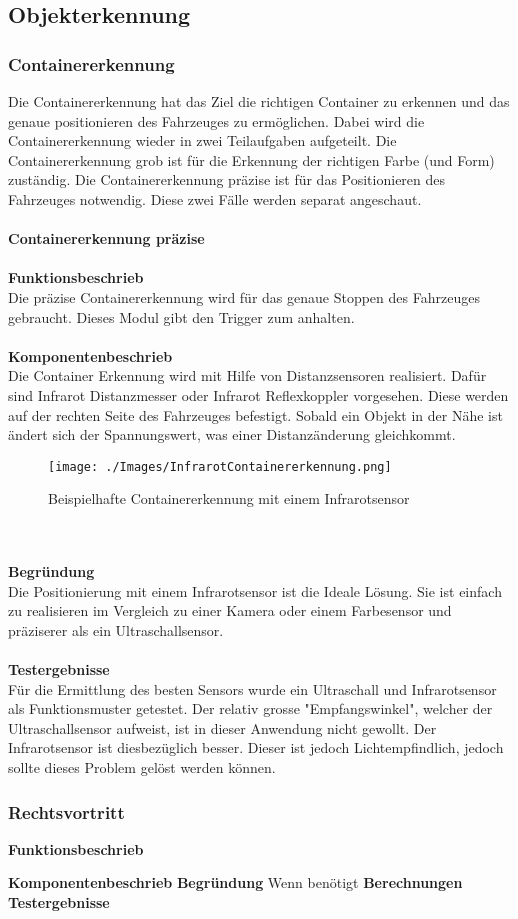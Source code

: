 \subsection{Objekterkennung}

\subsubsection{Containererkennung}
Die Containererkennung hat das Ziel die richtigen Container zu erkennen und das genaue positionieren des Fahrzeuges zu ermöglichen. Dabei wird die Containererkennung wieder in zwei Teilaufgaben aufgeteilt. Die Containererkennung grob ist für die Erkennung der richtigen Farbe (und Form) zuständig. Die Containererkennung präzise ist für das Positionieren des Fahrzeuges notwendig. Diese zwei Fälle werden separat angeschaut.\\
\\
\textbf{Containererkennung präzise}\\
\\
\textbf{Funktionsbeschrieb}\\
Die präzise Containererkennung wird für das genaue Stoppen des Fahrzeuges gebraucht. Dieses Modul gibt den Trigger zum anhalten.\\
\\
\textbf{Komponentenbeschrieb}\\
Die Container Erkennung wird mit Hilfe von Distanzsensoren realisiert. Dafür sind Infrarot Distanzmesser oder Infrarot Reflexkoppler vorgesehen. Diese werden auf der rechten Seite des Fahrzeuges befestigt. Sobald ein Objekt in der Nähe ist ändert sich der Spannungswert, was einer Distanzänderung gleichkommt. 
\begin{figure} [hbp]
	\centering
	\texttt{[image: ./Images/InfrarotContainererkennung.png]}
	\caption{Beispielhafte Containererkennung mit einem Infrarotsensor}
\end{figure}\\
\\
\textbf{Begründung}
\\
Die Positionierung mit einem Infrarotsensor ist die Ideale Lösung. Sie ist einfach zu realisieren im Vergleich zu einer Kamera oder einem Farbesensor und präziserer als ein Ultraschallsensor.\\
\\
\textbf{Testergebnisse}\\
Für die Ermittlung des besten Sensors wurde ein Ultraschall und Infrarotsensor als Funktionsmuster getestet. Der relativ grosse "Empfangswinkel", welcher der Ultraschallsensor aufweist, ist in dieser Anwendung nicht gewollt. Der Infrarotsensor ist diesbezüglich besser. Dieser ist jedoch Lichtempfindlich, jedoch sollte dieses Problem gelöst werden können.\
\\
\subsubsection{Rechtsvortritt}
\textbf{Funktionsbeschrieb}

\textbf{Komponentenbeschrieb}
\textbf{Begründung}
Wenn benötigt
\textbf{Berechnungen}
\textbf{Testergebnisse}